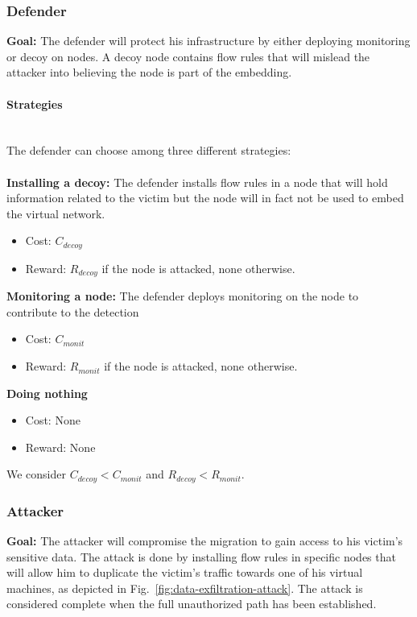 \subsubsection{Defender}
\textbf{Goal: } The defender will protect his infrastructure by either deploying monitoring or decoy on nodes. A decoy node contains flow rules that will mislead the attacker into believing the node is part of the embedding.

\paragraph{Strategies}\textbf{\\}
The defender can choose among three different strategies:\\ \\
\textbf{Installing a decoy: } The defender installs flow rules in a node that will hold information related to the victim but the node will in fact not be used to embed the virtual network.
\begin{itemize}
    \item Cost: $C_{decoy}$
    \item Reward: $R_{decoy}$ if the node is attacked, none otherwise.
\end{itemize}


\textbf{Monitoring a node: } The defender deploys monitoring on the node to contribute to the detection
\begin{itemize}
    \item Cost: $C_{monit}$
    \item Reward: $R_{monit}$ if the node is attacked, none otherwise.
\end{itemize}

\textbf{Doing nothing}
\begin{itemize}
    \item Cost: None
    \item Reward: None
\end{itemize}

We consider $C_{decoy}< C_{monit}$ and $R_{decoy}< R_{monit}$.

\subsubsection{Attacker}
\textbf{Goal: } The attacker will compromise the migration to gain access to his victim's sensitive data.
The attack is done by installing flow rules in specific nodes that will allow him to duplicate the victim's traffic towards one of his virtual machines, as depicted in Fig.~\ref{fig:data-exfiltration-attack}. The attack is considered complete when the full unauthorized path has been established.

